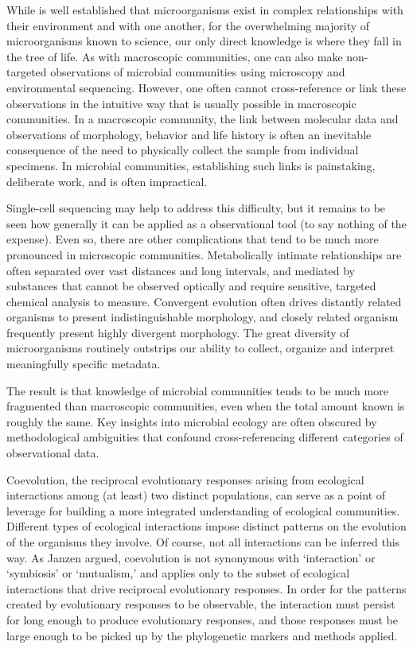 While is well established that microorganisms exist in complex relationships with their environment and with one another, for the overwhelming majority of microorganisms known to science, our only direct knowledge is where they fall in the tree of life. As with macroscopic communities, one can also make non-targeted observations of microbial communities using microscopy and environmental sequencing. However, one often cannot cross-reference or link these observations in the intuitive way that is usually possible in macroscopic communities. In a macroscopic community, the link between molecular data and observations of morphology, behavior and life history is often an inevitable consequence of the need to physically collect the sample from individual specimens. In microbial communities, establishing such links is painstaking, deliberate work, and is often impractical. 

Single-cell sequencing may help to address this difficulty, but it remains to be seen how generally it can be applied as a observational tool (to say nothing of the expense). Even so, there are other complications that tend to be much more pronounced in microscopic communities. Metabolically intimate relationships are often separated over vast distances and long intervals, and mediated by substances that cannot be observed optically and require sensitive, targeted chemical analysis to measure. Convergent evolution often drives distantly related organisms to present indistinguishable morphology, and closely related organism frequently present highly divergent morphology. The great diversity of microorganisms routinely outstrips our ability to collect, organize and interpret meaningfully specific metadata.

The result is that knowledge of microbial communities tends to be much more fragmented than macroscopic communities, even when the total amount known is roughly the same. Key insights into microbial ecology are often obscured by methodological ambiguities that confound cross-referencing different categories of observational data. 

Coevolution, the reciprocal evolutionary responses arising from ecological interactions among (at least) two distinct populations, can serve as a point of leverage for building a more integrated understanding of ecological communities. Different types of ecological interactions impose distinct patterns on the evolution of the organisms they involve. Of course, not all interactions can be inferred this way. As Janzen argued, coevolution is not synonymous with `interaction' or `symbiosis' or `mutualism,' and applies only to the subset of ecological interactions that drive reciprocal evolutionary responses. \cite{janzen1980coevolution} In order for the patterns created by evolutionary responses to be observable, the interaction must persist for long enough to produce evolutionary responses, and those responses must be large enough to be picked up by the phylogenetic markers and methods applied.

